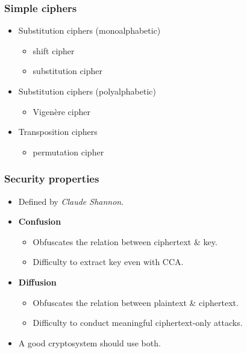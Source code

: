 \begin{frame}
  \frametitle{Simple ciphers}

  \pause
  \begin{itemize}
    \item Substitution ciphers (monoalphabetic)
    \begin{itemize}
      \item shift cipher
      \item substitution cipher
    \end{itemize}
    \pause
    \item Substitution ciphers (polyalphabetic)
    \begin{itemize}
      \item Vigenère cipher
    \end{itemize}
    \pause
    \item Transposition ciphers
    \begin{itemize}
      \item permutation cipher
    \end{itemize}
  \end{itemize}
\end{frame}

\begin{frame}
  \frametitle{Security properties}

  \pause
  \begin{itemize}
    \item Defined by \emph{Claude Shannon}.
    
    \vspace*{1em}

    \pause
    \item \textbf{Confusion}
    \begin{itemize}
      \item Obfuscates the relation between ciphertext \& key.
      \item Difficulty to extract key even with CCA.
    \end{itemize}

    \vspace*{1em}

    \pause
    \item \textbf{Diffusion}
    \begin{itemize}
      \item Obfuscates the relation between plaintext \& ciphertext.
      \item Difficulty to conduct meaningful ciphertext-only attacks.
    \end{itemize}

    \vspace*{1em}

    \pause
    \item A good cryptosystem should use both.
  \end{itemize}
\end{frame}


